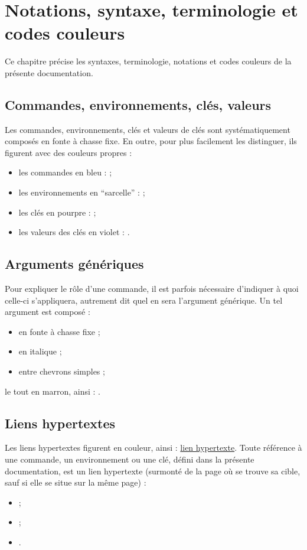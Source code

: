 
\chapter{Notations, syntaxe, terminologie et codes couleurs}\label{cha:synt-term-notat}

Ce chapitre précise les syntaxes, terminologie, notations et codes couleurs de
la présente documentation.


\section{Commandes, environnements, clés, valeurs}\label{sec:comm-envir-cles}

Les commandes, environnements, clés et valeurs de clés sont systématiquement
composés en fonte à chasse fixe. En outre, pour plus facilement les
distinguer, ils figurent avec des couleurs propres :
\begin{itemize}
\item les commandes en bleu :  ;
\item les environnements en \enquote{sarcelle} :
   ;
\item les clés en pourpre :  ;
\item les valeurs des clés en violet : .
\end{itemize}

\section{Arguments génériques}
\label{sec:arguments-generiques}

Pour expliquer le rôle d'une commande, il est parfois nécessaire d'indiquer
à quoi celle-ci s'appliquera, autrement dit quel en sera l'argument générique.
Un tel argument est composé :
\begin{itemize}
\item en fonte à chasse fixe ;
\item en italique ;
\item entre chevrons simples ;
\end{itemize}
le tout en marron, ainsi : .

\section{Liens hypertextes}
\label{sec:liens-hypertextes}

Les liens hypertextes figurent en couleur, ainsi :
\href{http://gte.univ-littoral.fr/members/dbitouze/pub/latex}{lien hypertexte}.
Toute référence à une commande, un environnement ou une clé, défini dans la
présente documentation, est un lien hypertexte (surmonté de la page où se
trouve sa cible, sauf si elle se situe sur la même page) :
\begin{itemize}
\item {} ;
\item {} ;
\item {}.
\end{itemize}



